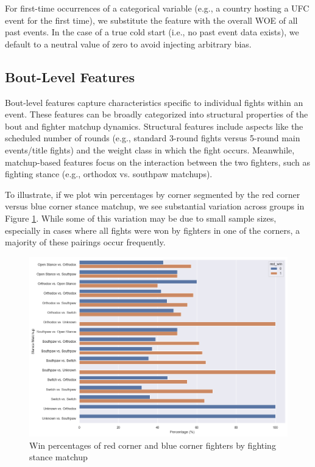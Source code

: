 \documentclass[12pt,twoside]{report}
\begin{document}
For first-time occurrences of a categorical variable (e.g., a country hosting a UFC event for the first time), we substitute the feature with the overall WOE of all past events. In the case of a true cold start (i.e., no past event data exists), we default to a neutral value of zero to avoid injecting arbitrary bias.

\subsection{Bout-Level Features}

Bout-level features capture characteristics specific to individual fights within an event. These features can be broadly categorized into structural properties of the bout and fighter matchup dynamics. Structural features include aspects like the scheduled number of rounds (e.g., standard 3-round fights versus 5-round main events/title fights) and the weight class in which the fight occurs. Meanwhile, matchup-based features focus on the interaction between the two fighters, such as fighting stance (e.g., orthodox vs. southpaw matchups).

To illustrate, if we plot win percentages by corner segmented by the red corner versus blue corner stance matchup, we see substantial variation across groups in Figure \ref{stance_matchups}. While some of this variation may be due to small sample sizes, especially in cases where all fights were won by fighters in one of the corners, a majority of these pairings occur frequently. 

\begin{figure}[!htb]
    \centering
    \includegraphics[width=\linewidth]{figures/stance_matchups.png}
    \caption{Win percentages of red corner and blue corner fighters by fighting stance matchup}
    \label{stance_matchups}
\end{figure}
\end{document}
